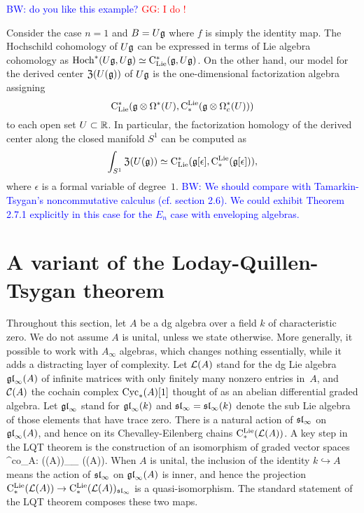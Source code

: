 \documentclass[11pt]{amsart}
\numberwithin{equation}{section}
\def\brian{\textcolor{blue}{BW: }\textcolor{blue}}
\def\greg{\textcolor{red}{GG: }\textcolor{red}}
\begin{document}
\brian{do you like this example?} \greg{I do !}
\begin{eg}\label{eg: TT}
Consider the case $n=1$ and $B = U \fg$ where $f$ is simply the identity map. 
The Hochschild cohomology of $U \fg$ can be expressed in terms of Lie algebra cohomology as $\Hoch^*(U\fg,U\fg) \simeq \clies(\fg, U\fg)$. 
On the other hand, our model for the derived center ${\frak Z}(U(\fg))$ of $U \fg$ is the one-dimensional factorization algebra assigning 
\[
\clies(\fg \otimes \Omega^*(U), \cliels( \fg \otimes \Omega^*_c(U)))
\]
to each open set $U \subset \RR$.
In particular, the factorization homology of the derived center along the closed manifold $S^1$ can be computed as
\[
\int_{S^1} {\frak Z}(U(\fg)) \simeq \clies(\fg[\epsilon], \cliels( \fg[\epsilon])),
\]
where $\epsilon$ is a formal variable of degree~$1$. 
\brian{We should compare with Tamarkin-Tsygan's noncommutative calculus (cf. section 2.6).
We could exhibit Theorem 2.7.1 explicitly in this case for the $E_n$ case with enveloping algebras.}
\end{eg}

\section{A variant of the Loday-Quillen-Tsygan theorem}

Throughout this section, let $A$ be a dg algebra over a field $k$ of characteristic zero. We do not assume $A$ is unital, unless we state otherwise. More generally, it possible to work with $A_\infty$ algebras, which changes nothing essentially, while it adds a distracting layer of complexity. Let $\cL(A)$ stand for the dg Lie algebra $\gl_\infty(A)$ of infinite matrices with only finitely many nonzero entries in~$A$, and $\cC(A)$ the cochain complex $\Cyc_*(A)[1]$ thought of as an abelian differential graded algebra. Let $\gl_\infty$ stand for $\gl_\infty(k)$ and $\sl_\infty=\sl_\infty(k)$ denote the sub Lie algebra of those elements that have trace zero. There is a natural action of $\sl_\infty$ on $\gl_\infty(A)$, and hence on its Chevalley-Eilenberg chains $\cliels(\cL(A))$. A key step in the LQT theorem is the construction of an isomorphism of graded vector spaces
\beqn\label{lqtco}
\lambda^{co}_A: \cliels(\cL(A))_{\sl_\infty} \xto{\cong} \Sym(\cC(A)).
\eeqn
When $A$ is unital, the inclusion of the identity $k \hookrightarrow A$ means the action of $\sl_\infty$ on $\gl_\infty(A)$ is inner, 
and hence the projection $\cliels(\cL(A)) \to \cliels(\cL(A))_{\sl_\infty}$ is a quasi-isomorphism.
The standard statement of the LQT theorem composes these two maps.
\end{document}
